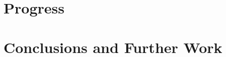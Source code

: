\documentclass[11pt]{article}
\begin{document}
\section{Progress}

\section{Conclusions and Further Work}




\end{document}
